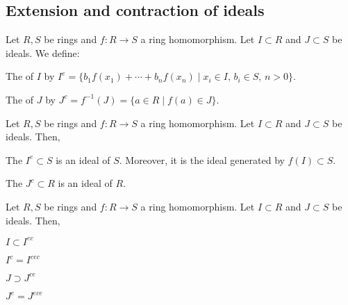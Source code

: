 \subsection{Extension and contraction of ideals}

\begin{definition}
	Let $R, S$ be rings and $f \colon R \rightarrow S$ a ring homomorphism. Let $I \subset R$ and $J \subset S$ be ideals. We define:
	\begin{enumeratedef}
		\item The  of $I$ by $I^e = \{ b_1 f(x_1) + \cdots + b_n f(x_n) \mid x_i \in I, \, b_i \in S, \, n > 0 \}$.
		\item The  of $J$ by $J^c = f^{-1}(J) = \{ a \in R \mid f(a) \in J \}$.
	\end{enumeratedef}
\end{definition}

\begin{prop}
	Let $R, S$ be rings and $f \colon R \rightarrow S$ a ring homomorphism. Let $I \subset R$ and $J \subset S$ be ideals. Then,
	\begin{enumerateprop}
		\item The  $I^e \subset S$ is an ideal of $S$. Moreover, it is the ideal generated by $f(I) \subset S$.
		\item The  $J^c \subset R$ is an ideal of $R$.
	\end{enumerateprop}
\end{prop}

\begin{prop}
	Let $R, S$ be rings and $f \colon R \rightarrow S$ a ring homomorphism. Let $I \subset R$ and $J \subset S$ be ideals. Then,
	\begin{enumerateprop}
		\item $I \subset I^{e c}$
		\item $I^c = I^{c e c}$
		\item $J \supset J^{c e}$
		\item $J^e = J^{e c e}$
	\end{enumerateprop}
\end{prop}

